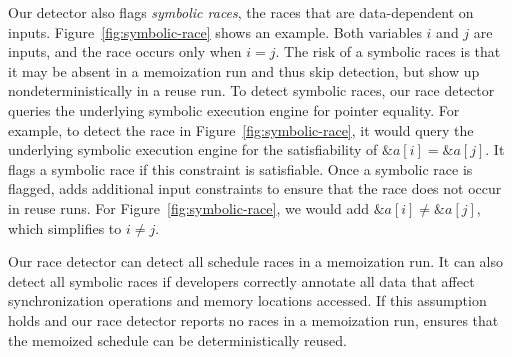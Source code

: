 Our detector also flags \emph{symbolic races}, the races that are
data-dependent on inputs.  Figure~\ref{fig:symbolic-race} shows an example.
Both variables $i$ and $j$ are inputs, and the race occurs only when $i =
j$.  The risk of a symbolic races is that it may be absent in a
memoization run and thus skip detection, but show up nondeterministically
in a reuse run.  To detect symbolic races, our race detector queries the
underlying symbolic execution engine for pointer equality.  For example,
to detect the race in Figure~\ref{fig:symbolic-race}, it would query the
underlying symbolic execution engine for the satisfiability of
$\&a[i]=\&a[j]$.  It flags a symbolic race if this constraint is satisfiable.
Once a symbolic race is flagged, \tern adds additional input constraints to
ensure that the race does not occur in reuse runs.  For
Figure~\ref{fig:symbolic-race}, we would add $\&a[i]\neq \&a[j]$, which
simplifies to $i\neq j$.

Our race detector can detect all schedule races in a memoization run.  It
can also detect all symbolic races if developers correctly annotate all
data that affect synchronization operations and memory locations accessed.
If this assumption holds and our race detector reports no races in a
memoization run, \tern ensures that the memoized schedule can be
deterministically reused.




